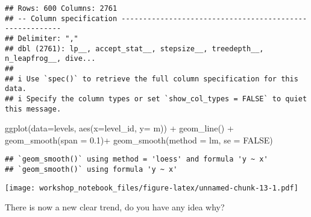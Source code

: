 \documentclass[
]{article}
\newenvironment{Shaded}{\begin{snugshade}}{\end{snugshade}}
\newcommand{\AttributeTok}[1]{\textcolor[rgb]{0.77,0.63,0.00}{#1}}
\newcommand{\ConstantTok}[1]{\textcolor[rgb]{0.00,0.00,0.00}{#1}}
\newcommand{\FloatTok}[1]{\textcolor[rgb]{0.00,0.00,0.81}{#1}}
\newcommand{\FunctionTok}[1]{\textcolor[rgb]{0.00,0.00,0.00}{#1}}
\newcommand{\NormalTok}[1]{#1}
\newcommand{\SpecialCharTok}[1]{\textcolor[rgb]{0.00,0.00,0.00}{#1}}
\begin{document}
\begin{verbatim}
## Rows: 600 Columns: 2761
## -- Column specification --------------------------------------------------------
## Delimiter: ","
## dbl (2761): lp__, accept_stat__, stepsize__, treedepth__, n_leapfrog__, dive...
## 
## i Use `spec()` to retrieve the full column specification for this data.
## i Specify the column types or set `show_col_types = FALSE` to quiet this message.
\end{verbatim}

\begin{Shaded}
\begin{Highlighting}[]
\FunctionTok{ggplot}\NormalTok{(}\AttributeTok{data=}\NormalTok{levels, }\FunctionTok{aes}\NormalTok{(}\AttributeTok{x=}\NormalTok{level\_id, }\AttributeTok{y=}\NormalTok{ m)) }\SpecialCharTok{+} 
  \FunctionTok{geom\_line}\NormalTok{() }\SpecialCharTok{+}
  \FunctionTok{geom\_smooth}\NormalTok{(}\AttributeTok{span =} \FloatTok{0.1}\NormalTok{)}\SpecialCharTok{+}
  \FunctionTok{geom\_smooth}\NormalTok{(}\AttributeTok{method =}\NormalTok{ lm, }\AttributeTok{se =} \ConstantTok{FALSE}\NormalTok{)}
\end{Highlighting}
\end{Shaded}

\begin{verbatim}
## `geom_smooth()` using method = 'loess' and formula 'y ~ x'
## `geom_smooth()` using formula 'y ~ x'
\end{verbatim}

\texttt{[image: workshop\_notebook\_files/figure-latex/unnamed-chunk-13-1.pdf]}

There is now a new clear trend, do you have any idea why?
\end{document}
